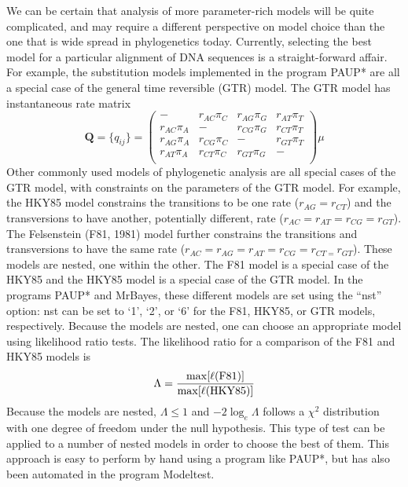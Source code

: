 \documentclass{svmult}
\begin{document}
We can be certain that analysis of more parameter-rich models will be quite complicated, and may require a different perspective on model choice than the one that
is wide spread in phylogenetics today. Currently, selecting the best
model for a particular alignment of DNA sequences is a straight-forward affair. For example, the substitution models implemented in the program PAUP* are
all a special case of the general time reversible (GTR) model. The GTR model has instantaneous rate matrix
\begin{equation*}
{\mathbf Q} = \{q_{ij}\} = \left( \begin{array}{cccc}
-                &  r_{AC} \pi_C & r_{AG} \pi_G & r_{AT} \pi_T \\
r_{AC} \pi_A & -                 & r_{CG} \pi_G & r_{CT} \pi_T \\
r_{AG} \pi_A & r_{CG} \pi_C & -                 & r_{GT} \pi_T \\
r_{AT} \pi_A & r_{CT} \pi_C & r_{GT} \pi_G & -                 \\
\end{array} \right) \mu
\end{equation*}
Other commonly used models of phylogenetic analysis are all special cases of the GTR model, with constraints on the parameters of the GTR model.
For example, the HKY85 model constrains the transitions to be one rate ($r_{AG} = r_{CT}$) and the transversions to have another, potentially different,
rate ($r_{AC} = r_{AT} = r_{CG} = r_{GT}$). The Felsenstein (F81, 1981) model further constrains the transitions and transversions to have the same rate
($r_{AC} = r_{AG} = r_{AT} = r_{CG} =  r_{CT = }r_{GT}$). These models are nested, one within the other. The F81 model is a special case of the HKY85 and
the HKY85 model is a special case of the GTR model. 
In the programs PAUP* and MrBayes, these different models are set using the ``nst'' option:
nst can be set to `1', `2', or `6' for the F81, HKY85, or GTR models, respectively. 
Because the models are nested, one can choose an appropriate model using
likelihood ratio tests. The likelihood ratio for a comparison of the F81 and HKY85 models is
$$
\Lambda = {\max[\ell(\mbox{F81})] \over \max[\ell(\mbox{HKY85})]}
$$
Because the models are nested, $\Lambda \leq 1$ and $-2\log_e \Lambda$ follows a $\chi^2$ distribution with one degree of freedom under the null
hypothesis. This type of test can be applied to a number of nested models in order to choose the best of them. This approach is easy to perform by hand using
a program like PAUP*, but has also been automated in the
program Modeltest. 
\end{document}
